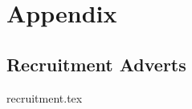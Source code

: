 
\cleardoublepage

\section*{Appendix}


\subsection*{Recruitment Adverts} \label{app:recruitment}
{recruitment.tex}

\newpage